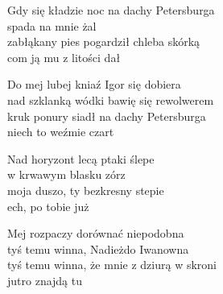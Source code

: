 \begin{text}
    Gdy się kładzie noc na dachy Petersburga\\
    spada na mnie żal\\
    zabłąkany pies pogardził chleba skórką\\
    com ją mu z litości dał

    Do mej lubej kniaź Igor się dobiera\\
    nad szklanką wódki bawię się rewolwerem\\
    kruk ponury siadł na dachy Petersburga\\
    niech to weźmie czart

    Nad horyzont lecą ptaki ślepe\\
    w krwawym blasku zórz\\
    moja duszo, ty bezkresny stepie\\
    ech, po tobie już

    Mej rozpaczy dorównać niepodobna\\
    tyś temu winna, Nadieżdo Iwanowna\\
    tyś temu winna, że mnie z dziurą w skroni\\
    jutro znajdą tu
\end{text}
\begin{chord}

\end{chord}